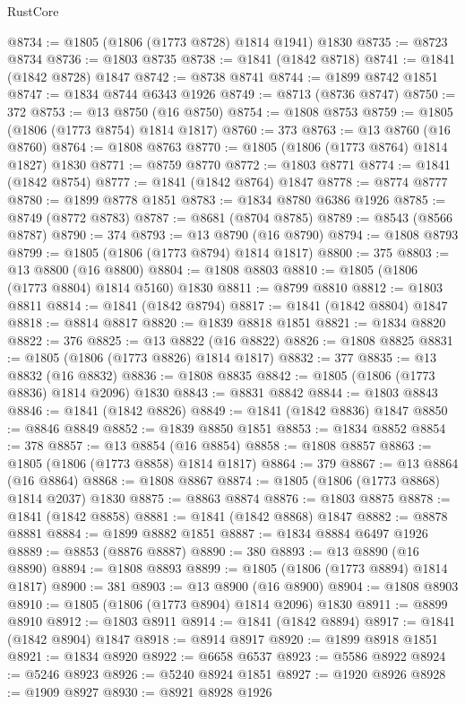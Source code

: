 \begin{lexlean}{RustCore}
\begin{coremodule}
@8734 := @1805 (@1806 (@1773 @8728) @1814 @1941) @1830
@8735 := @8723 @8734
@8736 := @1803 @8735
@8738 := @1841 (@1842 @8718)
@8741 := @1841 (@1842 @8728) @1847
@8742 := @8738 @8741
@8744 := @1899 @8742 @1851
@8747 := @1834 @8744 @6343 @1926
@8749 := @8713 (@8736 @8747)
@8750 := 372
@8753 := @13 @8750 (@16 @8750)
@8754 := @1808 @8753
@8759 := @1805 (@1806 (@1773 @8754) @1814 @1817)
@8760 := 373
@8763 := @13 @8760 (@16 @8760)
@8764 := @1808 @8763
@8770 := @1805 (@1806 (@1773 @8764) @1814 @1827) @1830
@8771 := @8759 @8770
@8772 := @1803 @8771
@8774 := @1841 (@1842 @8754)
@8777 := @1841 (@1842 @8764) @1847
@8778 := @8774 @8777
@8780 := @1899 @8778 @1851
@8783 := @1834 @8780 @6386 @1926
@8785 := @8749 (@8772 @8783)
@8787 := @8681 (@8704 @8785)
@8789 := @8543 (@8566 @8787)
@8790 := 374
@8793 := @13 @8790 (@16 @8790)
@8794 := @1808 @8793
@8799 := @1805 (@1806 (@1773 @8794) @1814 @1817)
@8800 := 375
@8803 := @13 @8800 (@16 @8800)
@8804 := @1808 @8803
@8810 := @1805 (@1806 (@1773 @8804) @1814 @5160) @1830
@8811 := @8799 @8810
@8812 := @1803 @8811
@8814 := @1841 (@1842 @8794)
@8817 := @1841 (@1842 @8804) @1847
@8818 := @8814 @8817
@8820 := @1839 @8818 @1851
@8821 := @1834 @8820
@8822 := 376
@8825 := @13 @8822 (@16 @8822)
@8826 := @1808 @8825
@8831 := @1805 (@1806 (@1773 @8826) @1814 @1817)
@8832 := 377
@8835 := @13 @8832 (@16 @8832)
@8836 := @1808 @8835
@8842 := @1805 (@1806 (@1773 @8836) @1814 @2096) @1830
@8843 := @8831 @8842
@8844 := @1803 @8843
@8846 := @1841 (@1842 @8826)
@8849 := @1841 (@1842 @8836) @1847
@8850 := @8846 @8849
@8852 := @1839 @8850 @1851
@8853 := @1834 @8852
@8854 := 378
@8857 := @13 @8854 (@16 @8854)
@8858 := @1808 @8857
@8863 := @1805 (@1806 (@1773 @8858) @1814 @1817)
@8864 := 379
@8867 := @13 @8864 (@16 @8864)
@8868 := @1808 @8867
@8874 := @1805 (@1806 (@1773 @8868) @1814 @2037) @1830
@8875 := @8863 @8874
@8876 := @1803 @8875
@8878 := @1841 (@1842 @8858)
@8881 := @1841 (@1842 @8868) @1847
@8882 := @8878 @8881
@8884 := @1899 @8882 @1851
@8887 := @1834 @8884 @6497 @1926
@8889 := @8853 (@8876 @8887)
@8890 := 380
@8893 := @13 @8890 (@16 @8890)
@8894 := @1808 @8893
@8899 := @1805 (@1806 (@1773 @8894) @1814 @1817)
@8900 := 381
@8903 := @13 @8900 (@16 @8900)
@8904 := @1808 @8903
@8910 := @1805 (@1806 (@1773 @8904) @1814 @2096) @1830
@8911 := @8899 @8910
@8912 := @1803 @8911
@8914 := @1841 (@1842 @8894)
@8917 := @1841 (@1842 @8904) @1847
@8918 := @8914 @8917
@8920 := @1899 @8918 @1851
@8921 := @1834 @8920
@8922 := @6658 @6537
@8923 := @5586 @8922
@8924 := @5246 @8923
@8926 := @5240 @8924 @1851
@8927 := @1920 @8926
@8928 := @1909 @8927
@8930 := @8921 @8928 @1926

\end{coremodule}
\end{lexlean}
